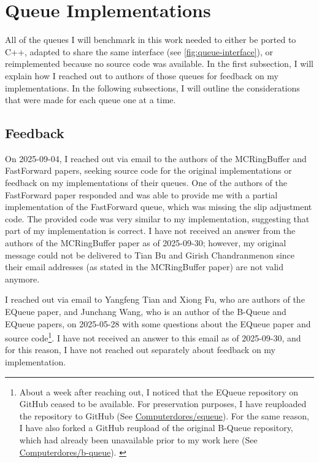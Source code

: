 \chapter{Queue Implementations}
All of the queues I will benchmark in this work needed to either be ported to C++, adapted to share the same
interface (see \autoref{fig:queue-interface}), or reimplemented because no source code was available.
In the first subsection, I will explain how I reached out to authors of those queues for feedback on my implementations.
In the following subsections, I will outline the considerations that were made for each queue one at a time.

\section{Feedback}
On 2025-09-04, I reached out via email to the authors of the MCRingBuffer and FastForward papers, seeking
source code for the original implementations or feedback on my implementations of their queues.
One of the authors of the FastForward paper responded and was able to provide me with a partial
implementation of the FastForward queue, which was missing the slip adjustment code.
The provided code was very similar to my implementation, suggesting that part of my implementation is correct.
I have not received an answer from the authors of the MCRingBuffer paper as of 2025-09-30; however, my
original message could not be delivered to Tian Bu and Girish Chandranmenon since their email addresses (as
stated in the MCRingBuffer paper) are not valid anymore.

I reached out via email to Yangfeng Tian and Xiong Fu, who are authors of the EQueue paper, and Junchang
Wang, who is an author of the B-Queue and EQueue papers, on 2025-05-28 with some questions about the EQueue
paper and source code\footnote{About a week after reaching out,
    I noticed that the EQueue repository on GitHub ceased to be available.
    For preservation purposes, I have reuploaded the repository to GitHub (See
    \href{https://github.com/Computerdores/equeue}{Computerdores/equeue}).
    For the same reason, I have also forked a GitHub reupload of the original B-Queue
    repository, which had already been unavailable prior to my work here (See
    \href{https://github.com/Computerdores/b-queue}{Computerdores/b-queue}).
\label{equeue-bqueue-links}}.
I have not received an answer to this email as of 2025-09-30, and for this reason, I have not reached out separately
about feedback on my implementation.

